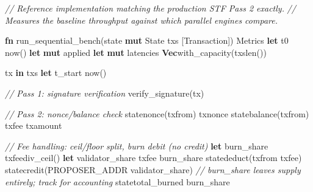 \documentclass[11pt,a4paper]{article}
\providecommand{\NormalTok}[1]{#1}
\providecommand{\KeywordTok}[1]{\textbf{#1}}
\providecommand{\DataTypeTok}[1]{\textbf{#1}}
\providecommand{\CommentTok}[1]{\textit{#1}}
\newenvironment{Shaded}{}{}
\newenvironment{Highlighting}[1][]{\par\noindent\begin{minipage}{\linewidth}\ttfamily\small}{\end{minipage}\par}
\begin{document}
\begin{Shaded}
\begin{Highlighting}[]
\CommentTok{// Reference implementation matching the production STF Pass 2 exactly.}
\CommentTok{// Measures the baseline throughput against which parallel engines compare.}

\KeywordTok{fn}\NormalTok{ run\_sequential\_bench(state}\OperatorTok{:} \OperatorTok{\&}\KeywordTok{mut}\NormalTok{ State}\OperatorTok{,}\NormalTok{ txs}\OperatorTok{:} \OperatorTok{\&}\NormalTok{[Transaction]) }\OperatorTok{{-}\textgreater{}}\NormalTok{ Metrics }\OperatorTok{\{}
    \KeywordTok{let}\NormalTok{ t0 }\OperatorTok{=} \NormalTok{now()}\OperatorTok{;}
    \KeywordTok{let} \KeywordTok{mut}\NormalTok{ applied }\OperatorTok{=} \OperatorTok{;}
    \KeywordTok{let} \KeywordTok{mut}\NormalTok{ latencies }\OperatorTok{=} \DataTypeTok{Vec}\PreprocessorTok{::}\NormalTok{with\_capacity(txs}\NormalTok{len())}\OperatorTok{;}

    \NormalTok{ tx }\KeywordTok{in}\NormalTok{ txs }\OperatorTok{\{}
        \KeywordTok{let}\NormalTok{ t\_start }\OperatorTok{=} \NormalTok{now()}\OperatorTok{;}

        \CommentTok{// Pass 1: signature verification}
         \OperatorTok{!}\NormalTok{verify\_signature(tx) }\OperatorTok{\{} \OperatorTok{;} \OperatorTok{\}}

        \CommentTok{// Pass 2: nonce/balance check}
        \NormalTok{ state}\NormalTok{nonce(tx}\NormalTok{from) }\OperatorTok{!=}\NormalTok{ tx}\NormalTok{nonce }\OperatorTok{\{} \OperatorTok{;} \OperatorTok{\}}
        \NormalTok{ state}\NormalTok{balance(tx}\NormalTok{from) }\OperatorTok{\textless{}}\NormalTok{ tx}\NormalTok{fee }\OperatorTok{+}\NormalTok{ tx}\NormalTok{amount }\OperatorTok{\{} \OperatorTok{;} \OperatorTok{\}}

        \CommentTok{// Fee handling: ceil/floor split, burn debit (no credit)}
        \KeywordTok{let}\NormalTok{ burn\_share }\OperatorTok{=}\NormalTok{ tx}\NormalTok{fee}\NormalTok{div\_ceil(}\NormalTok{)}\OperatorTok{;}
        \KeywordTok{let}\NormalTok{ validator\_share }\OperatorTok{=}\NormalTok{ tx}\NormalTok{fee }\OperatorTok{{-}}\NormalTok{ burn\_share}\OperatorTok{;}
\NormalTok{        state}\NormalTok{deduct(tx}\NormalTok{from}\OperatorTok{,}\NormalTok{ tx}\NormalTok{fee)}\OperatorTok{;}
\NormalTok{        state}\NormalTok{credit(PROPOSER\_ADDR}\OperatorTok{,}\NormalTok{ validator\_share)}\OperatorTok{;}
        \CommentTok{// burn\_share leaves supply entirely; track for accounting}
\NormalTok{        state}\NormalTok{total\_burned }\OperatorTok{+=}\NormalTok{ burn\_share}\OperatorTok{;}


\end{Highlighting}
\end{Shaded}
\end{document}
